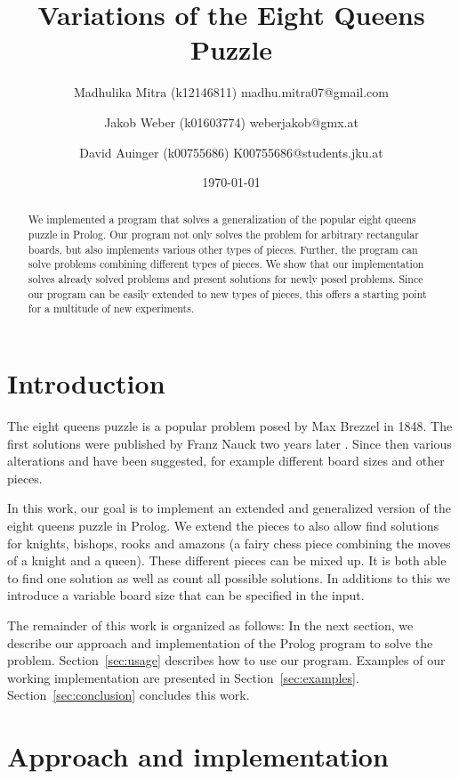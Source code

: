 \documentclass{article}
\title{Variations of the Eight Queens Puzzle}
\author{Madhulika Mitra (k12146811) madhu.mitra07@gmail.com \and
Jakob Weber (k01603774) weberjakob@gmx.at \and
David Auinger (k00755686) K00755686@students.jku.at}
\date{\today}
\begin{document}
\maketitle

\begin{abstract} \noindent
    We implemented a program that solves a generalization of the popular eight queens puzzle in Prolog. Our program not only solves the problem for arbitrary rectangular boards, but also implements various other types of pieces. Further, the program can solve problems combining different types of pieces. We show that our implementation solves already solved problems and present solutions for newly posed problems. Since our program can be easily extended to new types of pieces, this offers a starting point for a multitude of new experiments.
\end{abstract}

\section{Introduction}

The eight queens puzzle is a popular problem posed by Max Brezzel in 1848. The first solutions were published by Franz Nauck two years later \cite{CAMPBELL1977397}. Since then various alterations and have been suggested, for example different board sizes and other pieces.

In this work, our goal is to implement an extended and generalized version of the eight queens puzzle in Prolog. We extend the pieces to also allow find solutions for knights, bishops, rooks and amazons (a fairy chess piece combining the moves of a knight and a queen). These different pieces can be mixed up. It is both able to find one solution as well as count all possible solutions. In additions to this we introduce a variable board size that can be specified in the input.

The remainder of this work is organized as follows: In the next section, we describe our approach and implementation of the Prolog program to solve the problem. Section~\ref{sec:usage} describes how to use our program. Examples of our working implementation are presented in Section~\ref{sec:examples}. Section~\ref{sec:conclusion} concludes this work.

\section{Approach and implementation} \label{sec:approach}
\end{document}
